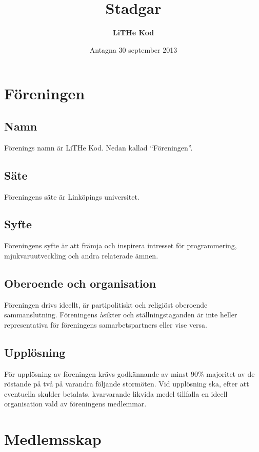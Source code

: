 \documentclass[11pt,a4paper]{article}
\title{\textbf{Stadgar}}
\date{Antagna 30 september 2013}
\author{\textbf{LiTHe Kod}}
\begin{document}
\maketitle
\thispagestyle{empty}
\pagebreak
\tableofcontents
\pagebreak

\pagestyle{fancy}

\section{Föreningen}
\subsection{Namn}
Förenings namn är LiTHe Kod. Nedan kallad ``Föreningen''.
\subsection{Säte}
Föreningens säte är Linköpings universitet.
\subsection{Syfte}\label{sec:syfte}
Föreningens syfte är att främja och inspirera intresset för programmering, mjukvaruutveckling och andra relaterade ämnen.
\subsection{Oberoende och organisation}
Föreningen drivs ideellt, är partipolitiskt och religiöst oberoende sammanslutning. Föreningens åsikter och ställningstaganden är inte heller representativa för föreningens samarbetspartners eller vise versa.
\subsection{Upplösning}
För upplösning av föreningen krävs godkännande av minst 90\% majoritet av de röstande på två på varandra följande stormöten. Vid upplösning ska, efter att eventuella skulder betalats, kvarvarande likvida medel tillfalla en ideell organisation vald av föreningens medlemmar.

\section{Medlemsskap}\label{sec:member}
\end{document}
